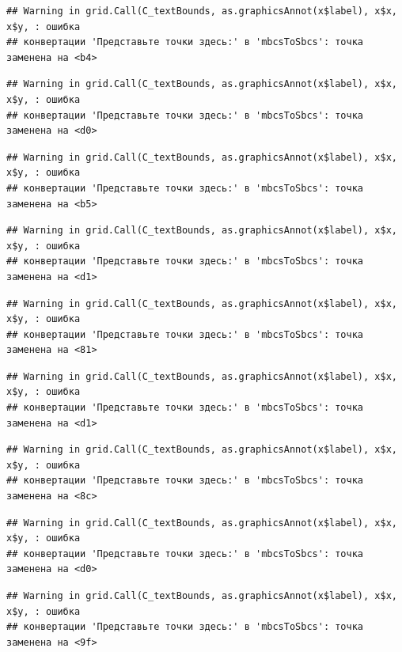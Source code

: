 \documentclass[]{book}
\begin{document}
\begin{verbatim}
## Warning in grid.Call(C_textBounds, as.graphicsAnnot(x$label), x$x, x$y, : ошибка
## конвертации 'Представьте точки здесь:' в 'mbcsToSbcs': точка заменена на <b4>
\end{verbatim}

\begin{verbatim}
## Warning in grid.Call(C_textBounds, as.graphicsAnnot(x$label), x$x, x$y, : ошибка
## конвертации 'Представьте точки здесь:' в 'mbcsToSbcs': точка заменена на <d0>
\end{verbatim}

\begin{verbatim}
## Warning in grid.Call(C_textBounds, as.graphicsAnnot(x$label), x$x, x$y, : ошибка
## конвертации 'Представьте точки здесь:' в 'mbcsToSbcs': точка заменена на <b5>
\end{verbatim}

\begin{verbatim}
## Warning in grid.Call(C_textBounds, as.graphicsAnnot(x$label), x$x, x$y, : ошибка
## конвертации 'Представьте точки здесь:' в 'mbcsToSbcs': точка заменена на <d1>
\end{verbatim}

\begin{verbatim}
## Warning in grid.Call(C_textBounds, as.graphicsAnnot(x$label), x$x, x$y, : ошибка
## конвертации 'Представьте точки здесь:' в 'mbcsToSbcs': точка заменена на <81>
\end{verbatim}

\begin{verbatim}
## Warning in grid.Call(C_textBounds, as.graphicsAnnot(x$label), x$x, x$y, : ошибка
## конвертации 'Представьте точки здесь:' в 'mbcsToSbcs': точка заменена на <d1>
\end{verbatim}

\begin{verbatim}
## Warning in grid.Call(C_textBounds, as.graphicsAnnot(x$label), x$x, x$y, : ошибка
## конвертации 'Представьте точки здесь:' в 'mbcsToSbcs': точка заменена на <8c>
\end{verbatim}

\begin{verbatim}
## Warning in grid.Call(C_textBounds, as.graphicsAnnot(x$label), x$x, x$y, : ошибка
## конвертации 'Представьте точки здесь:' в 'mbcsToSbcs': точка заменена на <d0>
\end{verbatim}

\begin{verbatim}
## Warning in grid.Call(C_textBounds, as.graphicsAnnot(x$label), x$x, x$y, : ошибка
## конвертации 'Представьте точки здесь:' в 'mbcsToSbcs': точка заменена на <9f>
\end{verbatim}
\end{document}
